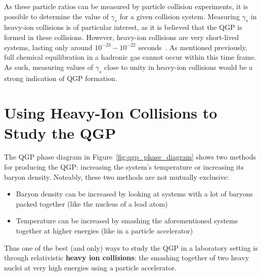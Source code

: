 As these particle ratios can be measured by particle collision experiments, it is possible to determine the value of $\gamma_s$ for a given collision system. Measuring $\gamma_s$ in heavy-ion collisions is of particular interest, as it is believed that the QGP is formed in these collisions. However, heavy-ion collisions are very short-lived systems, lasting only around $10^{-23} - 10^{-22}$ seconds~\cite{QGPFormation}. As mentioned previously, full chemical equilibration in a hadronic gas cannot occur within this time frame. As such, measuring values of $\gamma_s$ close to unity in heavy-ion collisions would be a strong indication of QGP formation.

\section{Using Heavy-Ion Collisions to Study the QGP}
\label{sec:heavy_ion_collisions}

The QGP phase diagram in Figure~\ref{fig:qgp_phase_diagram} shows two methods for producing the QGP: increasing the system's temperature or increasing its baryon density. Noteably, these two methods are not mutually exclusive: 
\begin{itemize}
    \item Baryon density can be increased by looking at systems with a lot of baryons packed together (like the nucleus of a lead atom)
    \item Temperature can be increased by smashing the aforementioned systems together at higher energies (like in a particle accelerator)
\end{itemize}
Thus one of the best (and only) ways to study the QGP in a laboratory setting is through relativistic \textbf{heavy ion collisions}: the smashing together of two heavy nuclei at very high energies using a particle accelerator. 


